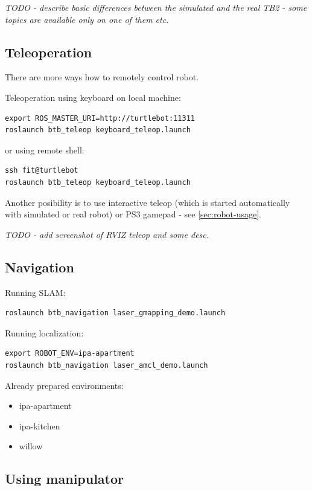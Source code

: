 \documentclass[12pt,a4paper,titlepage]{article}
\numberwithin{equation}{subsection}
\begin{document}
\emph{TODO - describe basic differences between the simulated and the real TB2 - some topics are available only on one of them etc.}


\subsection{Teleoperation}

There are more ways how to remotely control robot.

Teleoperation using keyboard on local machine:

\begin{verbatim}
export ROS_MASTER_URI=http://turtlebot:11311
roslaunch btb_teleop keyboard_teleop.launch
\end{verbatim}

or using remote shell:

\begin{verbatim}
ssh fit@turtlebot
roslaunch btb_teleop keyboard_teleop.launch
\end{verbatim}

Another posibility is to use interactive teleop (which is started automatically with simulated or real robot) or PS3 gamepad - see \ref{sec:robot-usage}.

\emph{TODO - add screenshot of RVIZ teleop and some desc.}

\subsection{Navigation}

Running SLAM:

\begin{verbatim}
roslaunch btb_navigation laser_gmapping_demo.launch
\end{verbatim}

Running localization:

\begin{verbatim}
export ROBOT_ENV=ipa-apartment
roslaunch btb_navigation laser_amcl_demo.launch
\end{verbatim}

Already prepared environments:

\begin{itemize}
 \item{ipa-apartment}
 \item{ipa-kitchen}
 \item{willow}
\end{itemize}


\subsection{Using manipulator}
\end{document}
